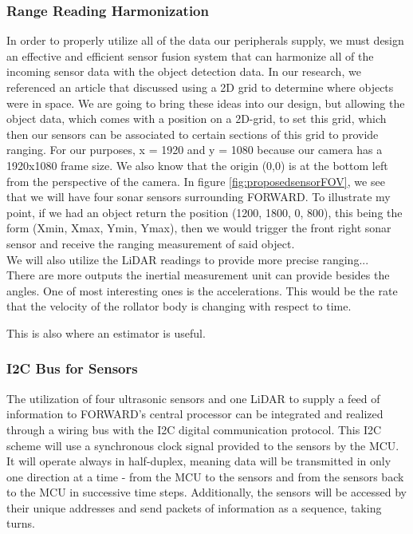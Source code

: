 \subsubsection{Range Reading Harmonization}
\noindent In order to properly utilize all of the data our peripherals supply, we must design an effective and efficient sensor fusion system that can harmonize all of the incoming sensor data with the object detection data. In our research, we referenced an article \cite{CVRef2} that discussed using a 2D grid to determine where objects were in space. We are going to bring these ideas into our design, but allowing the object data, which comes with a position on a 2D-grid, to set this grid, which then our sensors can be associated to certain sections of this grid to provide ranging. For our purposes, x = 1920 and y = 1080 because our camera has a 1920x1080 frame size. We also know that the origin (0,0) is at the bottom left from the perspective of the camera. In figure \ref{fig:proposedsensorFOV}, we see that we will have four sonar sensors surrounding FORWARD. To illustrate my point, if we had an object return the position (1200, 1800, 0, 800), this being the form (Xmin, Xmax, Ymin, Ymax), then we would trigger the front right sonar sensor and receive the ranging measurement of said object. \\

\noindent We will also utilize the LiDAR readings to provide more precise ranging... \\

\noindent There are more outputs the inertial measurement unit can provide besides the angles. One of most interesting ones is the accelerations. This would be the rate that the velocity of the rollator body is changing with respect to time. 

\noindent This is also where an estimator is useful.\\

\subsubsection{I2C Bus for Sensors}
\noindent The utilization of four ultrasonic sensors and one LiDAR to supply a feed of information to FORWARD's central processor can be integrated and realized through a wiring bus with the I2C digital communication protocol. This I2C scheme will use a synchronous clock signal provided to the sensors by the MCU. It will operate always in half-duplex, meaning data will be transmitted in only one direction at a time - from the MCU to the sensors and from the sensors back to the MCU in successive time steps. Additionally, the sensors will be accessed by their unique addresses and send packets of information as a sequence, taking turns.\\